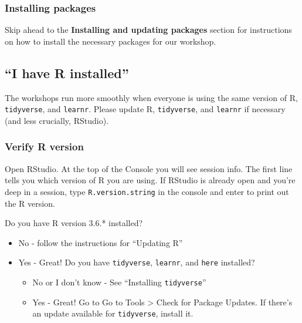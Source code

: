 \documentclass[
]{article}
\providecommand{\tightlist}{%
  \setlength{\itemsep}{0pt}\setlength{\parskip}{0pt}}
\begin{document}
\hypertarget{installing-packages}{%
\subsubsection{Installing packages}\label{installing-packages}}

Skip ahead to the \textbf{Installing and updating packages} section for
instructions on how to install the necessary packages for our workshop.

\hypertarget{i-have-r-installed}{%
\subsection{``I have R installed''}\label{i-have-r-installed}}

The workshops run more smoothly when everyone is using the same version
of R, \texttt{tidyverse}, and \texttt{learnr}. Please update R,
\texttt{tidyverse}, and \texttt{learnr} if necessary (and less
crucially, RStudio).

\hypertarget{verify-r-version}{%
\subsubsection{Verify R version}\label{verify-r-version}}

Open RStudio. At the top of the Console you will see session info. The
first line tells you which version of R you are using. If RStudio is
already open and you're deep in a session, type
\texttt{R.version.string} in the console and enter to print out the R
version.

Do you have R version 3.6.* installed?

\begin{itemize}
\tightlist
\item
  No - follow the instructions for ``Updating R''
\item
  Yes - Great! Do you have \texttt{tidyverse}, \texttt{learnr}, and
  \texttt{here} installed?

  \begin{itemize}
  \tightlist
  \item
    No or I don't know - See ``Installing \texttt{tidyverse}''
  \item
    Yes - Great! Go to Go to Tools \textgreater{} Check for Package
    Updates. If there's an update available for \texttt{tidyverse},
    install it.
  \end{itemize}
\end{itemize}
\end{document}
